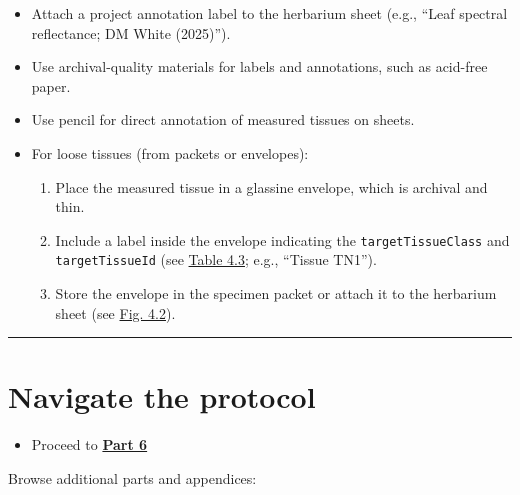 \documentclass[
  letterpaper,
  DIV=11,
  numbers=noendperiod]{scrreprt}
\providecommand{\tightlist}{%
  \setlength{\itemsep}{0pt}\setlength{\parskip}{0pt}}
\begin{document}
\begin{itemize}
\tightlist
\item
  Attach a project annotation label to the herbarium sheet (e.g., ``Leaf
  spectral reflectance; DM White (2025)'').\\
\item
  Use archival-quality materials for labels and annotations, such as
  acid-free paper.\\
\item
  Use pencil for direct annotation of measured tissues on sheets.\\
\item
  For loose tissues (from packets or envelopes):

  \begin{enumerate}
  \def\labelenumi{\arabic{enumi}.}
  \tightlist
  \item
    Place the measured tissue in a glassine envelope, which is archival
    and thin.\\
  \item
    Include a label inside the envelope indicating the
    \texttt{targetTissueClass} and \texttt{targetTissueId} (see
    \hyperref[tbl-4-3]{Table 4.3}; e.g., ``Tissue TN1'').\\
  \item
    Store the envelope in the specimen packet or attach it to the
    herbarium sheet (see \hyperref[f4-2]{Fig. 4.2}).
  \end{enumerate}
\end{itemize}

\begin{center}\rule{0.5\linewidth}{0.5pt}\end{center}

\section{Navigate the protocol}\label{navigate-the-protocol-5}

\begin{itemize}
\tightlist
\item
  Proceed to \hyperref[part6]{\textbf{Part 6}}
\end{itemize}

Browse additional parts and appendices:
\end{document}
